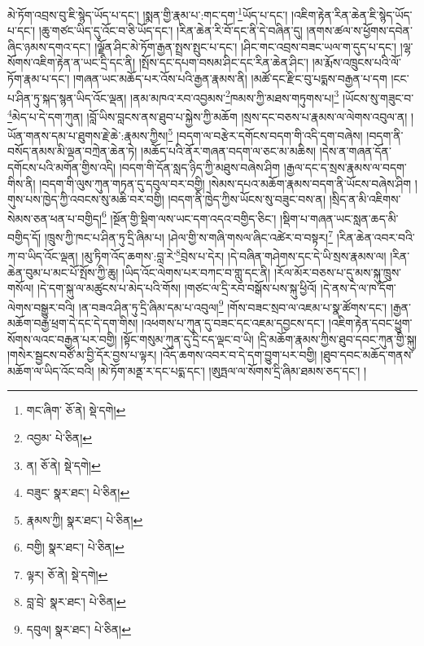 མེ་ཏོག་འབྲས་བུ་ཇི་སྙེད་ཡོད་པ་དང་། །སྨན་གྱི་རྣམ་པ་:གང་དག་\footnote{གང་ཞིག་  ཅོ་ནེ།  སྡེ་དགེ། }ཡོད་པ་དང་། །འཇིག་རྟེན་རིན་ཆེན་ཇི་སྙེད་ཡོད་པ་དང་། །ཆུ་གཙང་ཡིད་དུ་འོང་བ་ཅི་ཡོད་དང་། །རིན་ཆེན་རི་བོ་དང་ནི་དེ་བཞིན་དུ། །ནགས་ཚལ་ས་ཕྱོགས་དབེན་ཞིང་ཉམས་དགའ་དང་། །ལྗོན་ཤིང་མེ་ཏོག་རྒྱན་སྤྲས་སྤུང་པ་དང་། །ཤིང་གང་འབྲས་བཟང་ཡལ་ག་དུད་པ་དང་། །ལྷ་སོགས་འཇིག་རྟེན་ན་ཡང་དྲི་དང་ནི། །སྤོས་དང་དཔག་བསམ་ཤིང་དང་རིན་ཆེན་ཤིང་། །མ་རྨོས་འཁྲུངས་པའི་ལོ་ཏོག་རྣམ་པ་དང་། །གཞན་ཡང་མཆོད་པར་འོས་པའི་རྒྱན་རྣམས་ནི། །མཚོ་དང་རྫིང་བུ་པདྨས་བརྒྱན་པ་དག །ངང་པ་ཤིན་ཏུ་སྐད་སྙན་ཡིད་འོང་ལྡན། །ནམ་མཁའ་རབ་འབྱམས་\footnote{འབྱམ་  པེ་ཅིན། }ཁམས་ཀྱི་མཐས་གཏུགས་པ།\footnote{ན།  ཅོ་ནེ།  སྡེ་དགེ། } །ཡོངས་སུ་གཟུང་བ་\footnote{བཟུང་  སྣར་ཐང་།  པེ་ཅིན། }མེད་པ་དེ་དག་ཀུན། །བློ་ཡིས་བླངས་ནས་ཐུབ་པ་སྐྱེས་ཀྱི་མཆོག །སྲས་དང་བཅས་པ་རྣམས་ལ་ལེགས་འབུལ་ན། །ཡོན་གནས་དམ་པ་ཐུགས་རྗེ་ཆེ་:རྣམས་ཀྱིས།\footnote{རྣམས་ཀྱི།  སྣར་ཐང་།  པེ་ཅིན། } །བདག་ལ་བརྩེར་དགོངས་བདག་གི་འདི་དག་བཞེས། །བདག་ནི་བསོད་ནམས་མི་ལྡན་བཀྲེན་ཆེན་ཏེ། །མཆོད་པའི་ནོར་གཞན་བདག་ལ་ཅང་མ་མཆིས། །དེས་ན་གཞན་དོན་དགོངས་པའི་མགོན་གྱིས་འདི། །བདག་གི་དོན་སླད་ཉིད་ཀྱི་མཐུས་བཞེས་ཤིག །རྒྱལ་དང་ད་སྲས་རྣམས་ལ་བདག་གིས་ནི། །བདག་གི་ལུས་ཀུན་གཏན་དུ་དབུལ་བར་བགྱི། །སེམས་དཔའ་མཆོག་རྣམས་བདག་ནི་ཡོངས་བཞེས་ཤིག །གུས་པས་ཁྱེད་ཀྱི་འབངས་སུ་མཆི་བར་བགྱི། །བདག་ནི་ཁྱེད་ཀྱིས་ཡོངས་སུ་བཟུང་བས་ན། །སྲིད་ན་མི་འཇིགས་སེམས་ཅན་ཕན་པ་བགྱིད།\footnote{བགྱི།  སྣར་ཐང་།  པེ་ཅིན། } །སྔོན་གྱི་སྡིག་ལས་ཡང་དག་འདའ་བགྱིད་ཅིང་། །སྡིག་པ་གཞན་ཡང་སླན་ཆད་མི་བགྱིད་དོ། །ཁྲུས་ཀྱི་ཁང་པ་ཤིན་ཏུ་དྲི་ཞིམ་པ། །ཤེལ་གྱི་ས་གཞི་གསལ་ཞིང་འཚེར་བ་བསྟར།\footnote{ལྟར།  ཅོ་ནེ།  སྡེ་དགེ། } །རིན་ཆེན་འབར་བའི་ཀ་བ་ཡིད་འོང་ལྡན། །མུ་ཏིག་འོད་ཆགས་:བླ་རེ་\footnote{བླ་བྲེ་  སྣར་ཐང་།  པེ་ཅིན། }བྲེས་པ་དེར། །དེ་བཞིན་གཤེགས་དང་དེ་ཡི་སྲས་རྣམས་ལ། །རིན་ཆེན་བུམ་པ་མང་པོ་སྤོས་ཀྱི་ཆུ། །ཡིད་འོང་ལེགས་པར་བཀང་བ་གླུ་དང་ནི། །རོལ་མོར་བཅས་པ་དུ་མས་སྐུ་ཁྲུས་གསོལ། །དེ་དག་སྐུ་ལ་མཚུངས་པ་མེད་པའི་གོས། །གཙང་ལ་དྲི་རབ་བསྒོས་པས་སྐུ་ཕྱིའོ། །དེ་ནས་དེ་ལ་ཁ་དོག་ལེགས་བསྒྱུར་བའི། །ན་བཟའ་ཤིན་ཏུ་དྲི་ཞིམ་དམ་པ་འབུལ།\footnote{དབུལ།  སྣར་ཐང་།  པེ་ཅིན། } །གོས་བཟང་སྲབ་ལ་འཇམ་པ་སྣ་ཚོགས་དང་། །རྒྱན་མཆོག་བརྒྱ་ཕྲག་དེ་དང་དེ་དག་གིས། །འཕགས་པ་ཀུན་དུ་བཟང་དང་འཇམ་དབྱངས་དང་། །འཇིག་རྟེན་དབང་ཕྱུག་སོགས་ལའང་བརྒྱན་པར་བགྱི། །སྟོང་གསུམ་ཀུན་དུ་དྲི་ངད་ལྡང་བ་ཡི། །དྲི་མཆོག་རྣམས་ཀྱིས་ཐུབ་དབང་ཀུན་གྱི་སྐུ། །གསེར་སྦྱངས་བཙོ་མ་བྱི་དོར་བྱས་པ་ལྟར། །འོད་ཆགས་འབར་བ་དེ་དག་བྱུག་པར་བགྱི། །ཐུབ་དབང་མཆོད་གནས་མཆོག་ལ་ཡིད་འོང་བའི། །མེ་ཏོག་མནྡ་ར་དང་པདྨ་དང་། །ཨུཏྤལ་ལ་སོགས་དྲི་ཞིམ་ཐམས་ཅད་དང་། །
